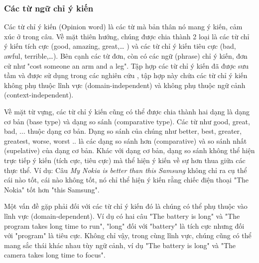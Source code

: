 \documentclass[12pt]{extarticle}
\begin{document}
			\subsubsection*{Các từ ngữ chỉ ý kiến}
				\label{ow_section}	
				\par Các từ chỉ ý kiến (Opinion word) là các từ mà bản thân nó mang ý kiến, cảm xúc ở trong câu. Về mặt thiên hướng, chúng được chia thành 2 loại là các từ chỉ ý kiến tích cực (good, amazing, great,… ) và các từ chỉ ý kiến tiêu cực (bad, awful, terrible,…). Bên cạnh các từ đơn, còn có các ngữ (phrase) chỉ ý kiến, đơn cử như "cost someone an arm and a leg". Tập hợp các từ chỉ ý kiến đã được sưu tầm và được sử dụng trong các nghiên cứu \cite{sentiment}, tập hợp này chứa các từ chỉ ý kiến không phụ thuộc lĩnh vực (domain-independent) và không phụ thuộc ngữ cảnh (context-independent).	
				\par Về mặt từ vựng, các từ chỉ ý kiến cũng có thể được chia thành hai dạng là dạng cơ bản (base type) và dạng so sánh (comparative type). Các từ như good, great, bad, ... thuộc dạng cơ bản. Dạng so sánh của chúng như better, best, greater, greatest, worse, worst .. là các dạng so sánh hơn (comparative) và so sánh nhất (supelative) của dạng cơ bản. Khác với dạng cơ bản, dạng so sánh không thể hiện trực tiếp ý kiến (tích cực, tiêu cực) mà thể hiện ý kiến về sự hơn thua giữa các thực thể. Ví dụ: Câu \textit{My Nokia is better than this Samsung} không chỉ ra cụ thể cái nào tốt, cái nào không tốt, nó chỉ thể hiện ý kiến rằng chiếc điện thoại "The Nokia" tốt hơn "this Samsung".
				\par Một vấn đề gặp phải đối với các từ chỉ ý kiến đó là chúng có thể phụ thuộc vào lĩnh vực (domain-dependent). Ví dụ có hai câu "The battery is long" và "The program takes long time to run", "long" đối với "battery" là tích cực nhưng đối với "program" là tiêu cực. Không chỉ vậy, trong cùng lĩnh vực, chúng cũng có thể mang sắc thái khác nhau tùy ngữ cảnh, ví dụ "The battery is long" và "The camera takes long time to focus".	
\end{document}
